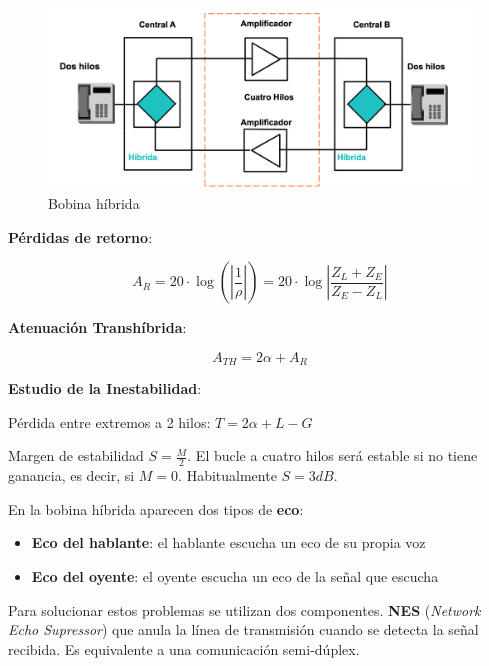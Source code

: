\documentclass[10pt,portrait, twocolumn]{article}
\begin{document}
	\begin{figure}[!ht]
 		\centering
  		 \includegraphics[scale = 0.25]{images/BobinaHibrida}
		\caption{Bobina híbrida}
	\end{figure}
	
\textbf{Pérdidas de retorno}:

	\begin{equation*}
		A_{R} =  20 \cdot \log \left( \left| \frac{1}{\rho} \right| \right) = 20 \cdot \log \left| \frac{Z_{L} + Z_{E}}{Z_{E} - Z_{L}} \right|
	\end{equation*}

\textbf{Atenuación Transhíbrida}:

	\begin{equation*}
		A_{TH} = 2 \alpha + A_{R}
	\end{equation*}
	
\textbf{Estudio de la Inestabilidad}:	
	
Pérdida entre extremos a 2 hilos: $T = 2 \alpha + L - G$

Margen de estabilidad $S = \frac{M}{2}$. El bucle a cuatro hilos será estable si no tiene ganancia, es decir, si $M = 0$. Habitualmente $S = 3 dB$.	
	
En la bobina híbrida aparecen dos tipos de \textbf{eco}:

	\begin{itemize}
		\item \textbf{Eco del hablante}: el hablante escucha un eco de su propia voz
		\item \textbf{Eco del oyente}: el oyente escucha un eco de la señal que escucha
	\end{itemize}
	
Para solucionar estos problemas se utilizan dos componentes. \textbf{NES} (\textit{Network Echo Supressor}) que anula la línea de transmisión cuando se detecta la señal recibida. Es equivalente a una comunicación semi-dúplex.
	
\end{document}

